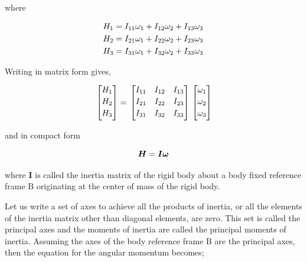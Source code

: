 where

\begin{align}{\label{eqn:angularMomentum1}}
\begin{split}
H_1 & = I_{11} \omega_1 + I_{12} \omega_2 + I_{13} \omega_3 \\
H_2 & = I_{21} \omega_1 + I_{22} \omega_2 + I_{23} \omega_3 \\
H_3 & = I_{31} \omega_1 + I_{32} \omega_2 + I_{33} \omega_3 \\
\end{split}
\end{align}

Writing in matrix form gives,

\begin{equation}{\label{eqn:angularMomentumInMatrixForm}}
\begin{bmatrix}
H_1\\[0.2em]
H_2\\[0.2em]
H_3\\[0.2em]
\end{bmatrix}
 =\,
\begin{bmatrix}
I_{11} & I_{12} & I_{13} \\[0.2em]
I_{21} & I_{22} & I_{23} \\[0.2em]
I_{31} & I_{32} &I_{33} \\[0.2em]
\end{bmatrix}
\,
\begin{bmatrix}
\omega_1\\[0.2em]
\omega_2\\[0.2em]
\omega_3\\[0.2em]
\end{bmatrix}
\end{equation}

and in compact form

\begin{equation}{\label{eqn:angMomentumComp2}}
\bm{H} = \bm{I} \bm{\omega}
\end{equation}

where $\bm{I}$  is called the inertia matrix of the rigid body about a body fixed reference frame B originating at the center of mass of the rigid body.

Let us write a set of axes to achieve all the products of inertia, or all the elements of the inertia matrix other than diagonal elements, are zero. 
This set is called the principal axes and the moments of inertia are called the principal moments of inertia. 
Assuming the axes of the body reference frame B are the principal axes, then the equation for the angular momentum becomes;

